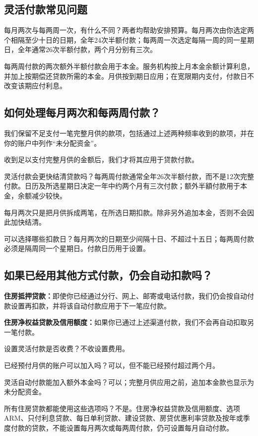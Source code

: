 \documentclass[UTF8,fontset=none,11pt,a4paper]{ctexart}
\begin{document}
\subsection*{灵活付款常见问题}
每月两次与每两周一次，有什么不同？两者均帮助安排预算。每月两次由你选定两个相隔至少十日的日期，全年24次半额付款；每两周一次选定每隔一周的同一星期日，全年通常26次半额付款，两个月分别有三次。


每两周付款的两次额外半额付款会用于本金。服务机构按上月本金余额计算利息，并加上按期偿还贷款所需的本金。月供按到期日应用；在宽限期内支付，付款日不改变该期应付利息。


\subsection*{如何处理每月两次和每两周付款？}
我们保留不足支付一笔完整月供的款项，包括通过上述两种频率收到的款项，并在你的账户中列作“未分配资金”。


收到足以支付完整月供的金额后，我们才将其应用于贷款付款。


灵活付款会更快结清贷款吗？每两周付款通常全年26次半额付款，而不是12次完整付款。日历及所选星期日决定一年中约两个月有三次付款；额外半額付款用于本金，余额减少较快。


每月两次只是把月供拆成两笔，在所选日期扣款。除非另外追加本金，否则不会因此加快结清。


可以选择哪些扣款日？每月两次的日期至少间隔十日、不超过十五日；每两周付款必须是隔周同一个星期日。付款日历用于设置。


\subsection*{如果已经用其他方式付款，仍会自动扣款吗？}
\textbf{住房抵押贷款：}即使你已经通过分行、网上、邮寄或电话付款，我们仍会按自动付款设置再扣款，并将该自动付款应用于下一笔应付款。


\textbf{住房净权益贷款及信用额度：}如果你已通过上述渠道付款，我们不会再自动扣取另一笔付款。


设置灵活付款是否收费？不收设置费用。


已经预付月供的账户可以加入吗？可以，但不能已经预付超过两个月。


灵活自动付款能加入额外本金吗？可以；完整月供应用之前，追加本金款也显示为未分配资金。


所有住房贷款都能使用这些选项吗？不是。住房净权益贷款及信用额度、选项ARM、只付利息贷款、每日单利贷款、建设贷款、房贷优惠利率贷款及按年或季度付款的贷款，不能设置每月两次或每两周付款，仍可设置每月自动付款。
\end{document}

